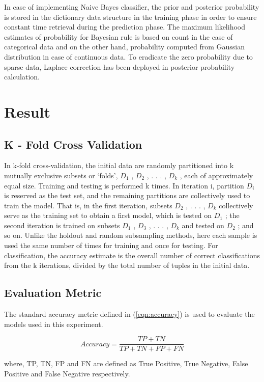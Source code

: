 \documentclass[12pt]{article}
\begin{document}
In case of implementing Naive Bayes classifier, the prior and posterior probability is stored in the dictionary data structure in the training phase in order to ensure constant time retrieval during the prediction phase. The maximum likelihood estimates of probability for Bayesian rule is based on count in the case of categorical data and on the other hand, probability computed from Gaussian distribution in case of continuous data. To eradicate the zero probability due to sparse data, Laplace correction has been deployed in posterior probability calculation.  


 
\section{Result}
\subsection{K - Fold Cross Validation}
In k-fold cross-validation, the initial data are randomly partitioned into k mutually exclusive subsets or `folds', $ D_1 $ , $ D_2 $ , . . . , $ D_k $ , each of approximately equal size. Training and testing is performed k times. In iteration i, partition $ D_i $ is reserved as the test set, and the remaining partitions are collectively used to train the model. That is, in the first iteration, subsets $ D_2 $ , . . . , $ D_k $ collectively serve as the training set to obtain a first model, which is tested on $ D_1 $ ; the second iteration is trained on subsets $ D_1 $ , $ D_3 $ , . . . , $ D_k $ and tested on $ D_2 $ ; and so on. Unlike the holdout and random subsampling methods, here each sample is used the same number of times for training and once for testing. For classification, the accuracy estimate is the overall number of correct classifications from the k iterations, divided by the total number of tuples in the initial data.


\subsection{Evaluation Metric}
The standard accuracy metric defined in (\ref{eqn:accuracy}) is used to evaluate the models used in this experiment.

\begin{equation}
\label{eqn:accuracy}
Accuracy = \frac{TP + TN}{TP + TN + FP + FN}
\end{equation} 

where, TP, TN, FP and FN are defined as True Positive, True Negative, False Positive and False Negative respectively.
\end{document}
